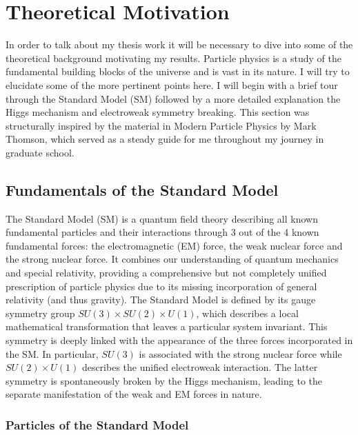 \chapter{Theoretical  Motivation}

In order to talk about my thesis work it will be necessary to dive into some of the theoretical
background motivating my results. Particle physics is a study of the fundamental building blocks
of the universe and is vast in its nature. I will try to elucidate some of the more pertinent points here. 
I will begin with a brief tour through the Standard Model (SM) followed by a more detailed explanation
the Higgs mechanism and electroweak symmetry breaking. This section was structurally inspired by the 
material in Modern Particle Physics by Mark Thomson, which served as a steady guide for me throughout 
my journey in graduate school.

\section{Fundamentals of the Standard Model}

The Standard Model (SM) is a quantum field theory describing all known fundamental particles and 
their interactions through 3 out of the 4 known fundamental forces: the electromagnetic (EM) force, the 
weak nuclear force and the strong nuclear force. It combines our understanding of quantum mechanics and 
special relativity, providing a comprehensive but not completely unified prescription of particle physics 
due to its missing incorporation of general relativity (and thus gravity). The Standard Model 
is defined by its gauge symmetry group $SU(3)\times SU(2)\times U(1)$, which describes a local mathematical 
transformation that leaves a particular system invariant. This symmetry is deeply linked with the 
appearance of the three forces incorporated in the SM. In particular, $SU(3)$ is associated with the strong 
nuclear force while $SU(2)\times U(1)$ describes the unified electroweak interaction. The latter symmetry is 
spontaneously broken by the Higgs mechanism, leading to the separate manifestation of the weak and 
EM forces in nature. \par

\subsection{Particles of the Standard Model}

